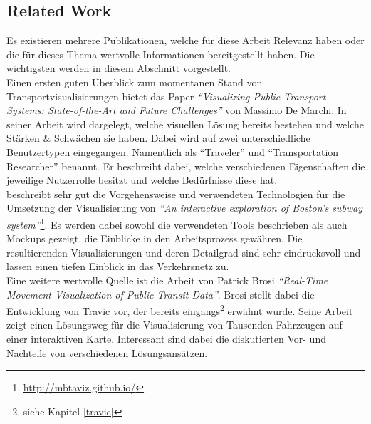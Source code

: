 \subsection{Related Work}
\label{sub:related_work}
  Es existieren mehrere Publikationen, welche für diese Arbeit Relevanz haben oder die für dieses Thema wertvolle Informationen bereitgestellt haben. Die wichtigsten werden in diesem Abschnitt vorgestellt.\\

  Einen ersten guten Überblick zum momentanen Stand von Transportvisualisierungen bietet das Paper \textit{"`Visualizing Public Transport Systems: State-of-the-Art and Future Challenges"'}\parencite{marchi} von Massimo De Marchi. In seiner Arbeit wird dargelegt, welche visuellen Lösung bereits bestehen und welche Stärken \& Schwächen sie haben. Dabei wird auf zwei unterschiedliche Benutzertypen eingegangen. Namentlich als "`Traveler"' und "`Transportation Researcher"' benannt. Er beschreibt dabei, welche verschiedenen Eigenschaften die jeweilige Nutzerrolle besitzt und welche Bedürfnisse diese hat.\\ 


  \parencite{mbtaviz} beschreibt sehr gut die Vorgehensweise und verwendeten Technologien für die Umsetzung der Visualisierung von \textit{"`An interactive exploration of Boston's subway system"'}\footnote{\url{http://mbtaviz.github.io/}}. Es werden dabei sowohl die verwendeten Tools beschrieben als auch Mockups gezeigt, die Einblicke in den Arbeitsprozess gewähren. Die resultierenden Visualisierungen und deren Detailgrad sind sehr eindrucksvoll und lassen einen tiefen Einblick in das Verkehrsnetz zu.\\

  Eine weitere wertvolle Quelle ist die Arbeit von Patrick Brosi \textit{"`Real-Time Movement Visualization of Public Transit Data"'}\parencite{brosi}. Brosi stellt dabei die Entwicklung von Travic vor, der bereits eingangs\footnote{siehe Kapitel \ref{travic}} erwähnt wurde. Seine Arbeit zeigt einen Lösungsweg für die Visualisierung von Tausenden Fahrzeugen auf einer interaktiven Karte. Interessant sind dabei die diskutierten Vor- und Nachteile von verschiedenen Lösungsansätzen.

